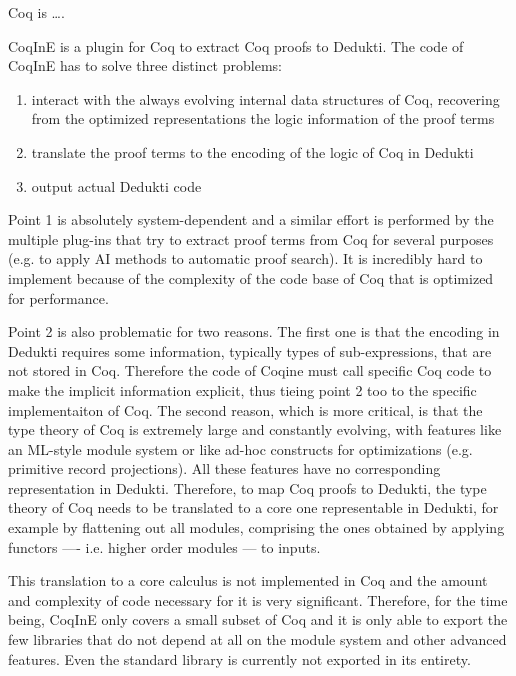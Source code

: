 

Coq is \ldots{}.

CoqInE is a plugin for Coq to extract Coq proofs to Dedukti. The code of CoqInE has to solve three distinct problems:
\begin{enumerate}
 \item interact with the always evolving internal data structures of Coq, recovering from the optimized representations the logic information of the proof terms
 \item translate the proof terms to the encoding of the logic of Coq in Dedukti
 \item output actual Dedukti code
\end{enumerate}

Point 1 is absolutely system-dependent and a similar effort is performed by the multiple plug-ins that try to extract proof terms from Coq for several purposes (e.g. to apply AI methods to automatic proof search). It is incredibly hard to implement because of the complexity of the code base of Coq that is optimized for performance.

Point 2 is also problematic for two reasons. The first one is that the encoding in Dedukti requires some information, typically types of sub-expressions, that are not stored in Coq. Therefore the code of Coqine must call specific Coq code to make the implicit information explicit, thus tieing point 2 too to the specific implementaiton of Coq. The second reason, which is more critical, is that the type theory of Coq is extremely large and constantly evolving, with features like an ML-style module system or like ad-hoc constructs for optimizations (e.g. primitive record projections). All these features have no corresponding representation in Dedukti. Therefore, to map Coq proofs to Dedukti, the type theory of Coq needs to be translated to a core one representable in Dedukti, for example by flattening out all modules, comprising the ones obtained by applying functors ---- i.e. higher order modules --- to inputs.

This translation to a core calculus is not implemented in Coq and the amount and complexity of code necessary for it is very significant. Therefore, for the time being, CoqInE only covers a small subset of Coq and it is only able to export the few libraries that do not depend at all on the module system and other advanced features. Even the standard library is currently not exported in its entirety.

